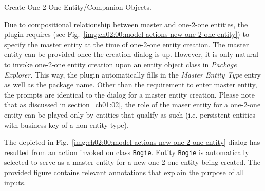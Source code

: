 \begin{image}{Create One-2-One Entity/Companion Objects.}{\label{img:ch02:00:model-actions-new-one-2-one-entity}}
    \end{image}  
  
  Due to compositional relationship between master and one-2-one entities, the plugin requires (see Fig.~\ref{img:ch02:00:model-actions-new-one-2-one-entity}) to specify the master entity at the time of one-2-one entity creation.
  The master entity can be provided once the creation dialog is up.
  However, it is only natural to invoke one-2-one entity creation upon an entity object class in \emph{Package Explorer}.
  This way, the plugin automatically fills in the \emph{Master Entity Type} entry as well as the package name.
  Other than the requirement to enter master entity, the prompts are identical to the dialog for a master entity creation.  
  Please note that as discussed in section~\ref{ch01:02}, the role of the maser entity for a one-2-one entity can be played only by entities that qualify as such (i.e. persistent entities with business key of a non-entity type).  
  
  The depicted in Fig.~\ref{img:ch02:00:model-actions-new-one-2-one-entity} dialog has resulted from an action invoked on class \texttt{Bogie}.
  Entity \texttt{Bogie} is automatically selected to serve as a master entity for a new one-2-one entity being created.
  The provided figure contains relevant annotations that explain the purpose of all inputs.

